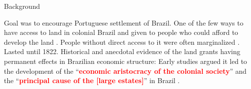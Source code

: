 \documentclass[aspectratio=1610]{beamer}
\begin{document}
\begin{frame}{Background}
    \begin{outline}
        \1 Goal was to encourage Portuguese settlement of Brazil.
        \vspace{2mm}
        \1 One of the few ways to have access to land in colonial Brazil and given to people who could afford to develop the land \parencites{Smith1944-oi}{Dean1971-iq}.
        \vspace{-1mm}
        \1 People without direct access to it were often marginalized \parencite{Simonsen2005-ps}.
        \vspace{2mm}
        \1 Lasted until 1822.
        \vspace{2mm}
        \1 Historical and anecdotal evidence of the land grants having permanent effects in Brazilian economic structure:
        \vspace{2mm}
            \2 Early studies argued it led to the development of the ``\textcolor{red}{\textbf{economic aristocracy of the colonial society}}'' and the ``\textcolor{red}{\textbf{principal cause of the [large estates]}}'' in Brazil \parencites[p.~36]{Lima1954-td}[p.~48]{Da_Costa_Porto1979-dz}. 
    \end{outline}    
\end{frame}



\end{document}
